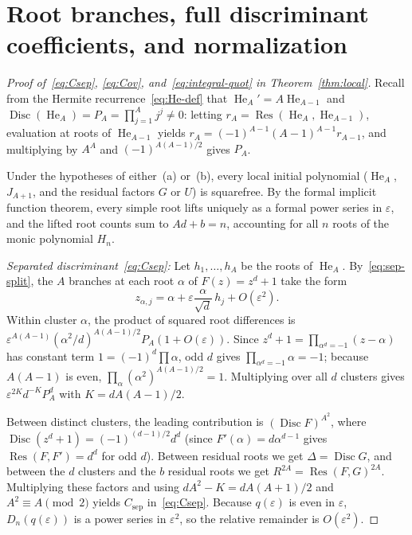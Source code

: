 \documentclass[11pt,reqno]{amsart}
\numberwithin{equation}{section}
\theoremstyle{definition}
\theoremstyle{remark}
\newcommand{\He}{\operatorname{He}}
\newcommand{\Disc}{\operatorname{Disc}}
\newcommand{\Res}{\operatorname{Res}}
\newcommand{\eps}{\varepsilon}
\begin{document}
\section{Root branches, full discriminant coefficients, and normalization}
\label{sec:disc-coeff}

\begin{proof}[Proof of~\eqref{eq:Csep}, \eqref{eq:Cov}, and~\eqref{eq:integral-quot} in Theorem~\ref{thm:local}]
Recall from the Hermite recurrence~\eqref{eq:He-def} that $\He_A'=A\He_{A-1}$ and $\Disc(\He_A)=P_A=\prod_{j=1}^A j^j\neq 0$: letting $r_A=\Res(\He_A,\He_{A-1})$, evaluation at roots of $\He_{A-1}$ yields $r_A=(-1)^{A-1}(A-1)^{A-1}r_{A-1}$, and multiplying by $A^A$ and $(-1)^{A(A-1)/2}$ gives $P_A$.

Under the hypotheses of either~(a) or~(b), every local initial polynomial ($\He_A$, $J_{A+1}$, and the residual factors $G$ or $U$) is squarefree. By the formal implicit function theorem, every simple root lifts uniquely as a formal power series in $\eps$, and the lifted root counts sum to $Ad+b=n$, accounting for all $n$ roots of the monic polynomial $H_n$.

\smallskip
\noindent\emph{Separated discriminant~\eqref{eq:Csep}:} Let $h_1,\ldots,h_A$ be the roots of $\He_A$. By~\eqref{eq:sep-split}, the $A$ branches at each root $\alpha$ of $F(z)=z^d+1$ take the form
\begin{equation}
\label{eq:sep-branch}
z_{\alpha,j} = \alpha + \eps\frac{\alpha}{\sqrt{d}}\,h_j + O(\eps^2).
\end{equation}
Within cluster $\alpha$, the product of squared root differences is $\eps^{A(A-1)}(\alpha^2/d)^{A(A-1)/2}P_A(1+O(\eps))$. Since $z^d+1=\prod_{\alpha^d=-1}(z-\alpha)$ has constant term $1=(-1)^d\prod\alpha$, odd $d$ gives $\prod_{\alpha^d=-1}\alpha=-1$; because $A(A-1)$ is even, $\prod_\alpha (\alpha^2)^{A(A-1)/2} = 1$. Multiplying over all $d$ clusters gives $\eps^{2K}d^{-K}P_A^d$ with $K=dA(A-1)/2$.

Between distinct clusters, the leading contribution is $(\Disc F)^{A^2}$, where $\Disc(z^d+1)=(-1)^{(d-1)/2}d^d$ (since $F'(\alpha)=d\alpha^{d-1}$ gives $\Res(F,F')=d^d$ for odd $d$). Between residual roots we get $\Delta=\Disc G$, and between the $d$ clusters and the $b$ residual roots we get $R^{2A}=\Res(F,G)^{2A}$. Multiplying these factors and using $dA^2 - K = dA(A+1)/2$ and $A^2\equiv A\pmod 2$ yields $C_{\mathrm{sep}}$ in~\eqref{eq:Csep}. Because $q(\eps)$ is even in $\eps$, $D_n(q(\eps))$ is a power series in $\eps^2$, so the relative remainder is $O(\eps^2)$.


\end{proof}
\end{document}
